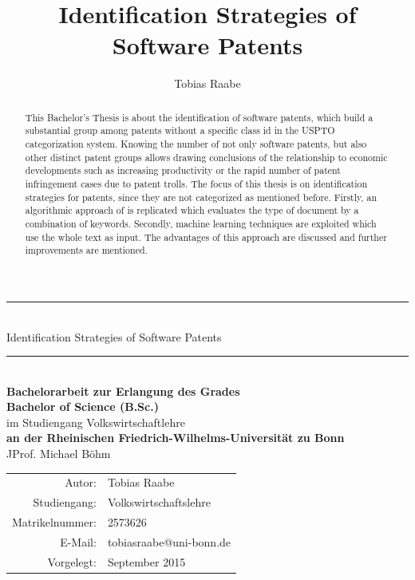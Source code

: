 \documentclass[12pt, a4paper]{scrartcl}
\author{Tobias Raabe}
\title{Identification Strategies of Software Patents}
\theoremstyle{definition}
\begin{document}

\newpage
\vspace*{2cm}
\begin{center}
\thispagestyle{empty}
\rule{14cm}{1pt}\\[1cm]
{\huge Identification Strategies of Software Patents}\\[1cm]
\rule{12cm}{1pt}\\[3cm]
\textbf{\large Bachelorarbeit zur Erlangung des Grades}\\[4pt]
\textbf{\large Bachelor of Science (B.Sc.)}\\[1cm]
{\large im Studiengang Volkswirtschaftlehre}\\[1cm]
\textbf{\large an der Rheinischen Friedrich-Wilhelms-Universität zu Bonn}\\[4pt]
{\large JProf. Michael B\"ohm}\\[4cm]
\begin{tabular}{rl}
\hline
Autor: & Tobias Raabe\\
Studiengang: & Volkswirtschaftslehre\\
Matrikelnummer: & 2573626\\
E-Mail: & tobiasraabe@uni-bonn.de\\
Vorgelegt: & September 2015\\
\hline
\end{tabular}
\end{center}

\newpage
\tableofcontents

\newpage

\begin{abstract}
    This Bachelor's Thesis is about the identification of software patents,
    which build a substantial group among patents without a specific class id
    in the USPTO categorization system. Knowing the number of not only software
    patents, but also other distinct patent groups allows drawing conclusions
    of the relationship to economic developments such as increasing
    productivity or the rapid number of patent infringement cases due to patent
    trolls. The focus of this thesis is on identification strategies for
    patents, since they are not categorized as mentioned before. Firstly, an
    algorithmic approach of \citet{bessen2007empirical} is replicated which
    evaluates the type of document by a combination of keywords. Secondly,
    machine learning techniques are exploited which use the whole text as
    input. The advantages of this approach are discussed and further
    improvements are mentioned.
\end{abstract}
\end{document}
